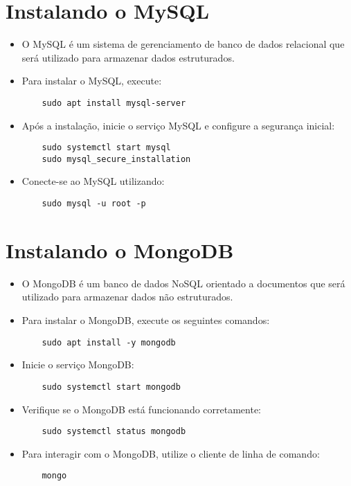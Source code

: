 \section{Instalando o MySQL}
\begin{itemize}
    \item O MySQL é um sistema de gerenciamento de banco de dados relacional que será utilizado para armazenar dados estruturados.
    \item Para instalar o MySQL, execute:
    \begin{verbatim}
    sudo apt install mysql-server
    \end{verbatim}
    \item Após a instalação, inicie o serviço MySQL e configure a segurança inicial:
    \begin{verbatim}
    sudo systemctl start mysql
    sudo mysql_secure_installation
    \end{verbatim}
    \item Conecte-se ao MySQL utilizando:
    \begin{verbatim}
    sudo mysql -u root -p
    \end{verbatim}
\end{itemize}

\section{Instalando o MongoDB}
\begin{itemize}
    \item O MongoDB é um banco de dados NoSQL orientado a documentos que será utilizado para armazenar dados não estruturados.
    \item Para instalar o MongoDB, execute os seguintes comandos:
    \begin{verbatim}
    sudo apt install -y mongodb
    \end{verbatim}
    \item Inicie o serviço MongoDB:
    \begin{verbatim}
    sudo systemctl start mongodb
    \end{verbatim}
    \item Verifique se o MongoDB está funcionando corretamente:
    \begin{verbatim}
    sudo systemctl status mongodb
    \end{verbatim}
    \item Para interagir com o MongoDB, utilize o cliente de linha de comando:
    \begin{verbatim}
    mongo
    \end{verbatim}
\end{itemize}

